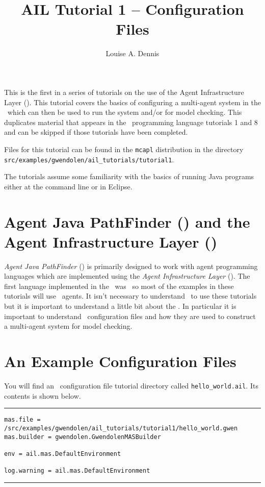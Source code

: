 \documentclass[a4]{article}
\author{Louise A. Dennis}
\title{AIL Tutorial 1 -- Configuration Files}
\begin{document}
\maketitle
This is the first in a series of tutorials on the use of the Agent Infrastructure Layer (\ail).  This tutorial covers the basics of configuring a multi-agent system in the \ail\ which can then be used to run the system and/or for model checking.  This duplicates material that appears in the \gwendolen\ programming language tutorials 1 and 8 and can be skipped if those tutorials have been completed.

Files for this tutorial can be found in the \texttt{mcapl} distribution in the directory \texttt{src/examples/gwendolen/ail\_tutorials/tutorial1}.

The tutorials assume some familiarity with the basics of running Java programs either at the command line or in Eclipse.

\section{Agent Java PathFinder (\ajpf) and the Agent Infrastructure Layer (\ail)}

\emph{Agent Java PathFinder} (\ajpf) is primarily designed to work with agent programming languages which are implemented using the \emph{Agent Infrastructure Layer} (\ail).  The first language implemented in the \ail\ was \gwendolen\ so most of the examples in these tutorials will use \gwendolen\ agents.  It isn't necessary to understand \gwendolen\ to use these tutorials but it is important to understand a little bit about the \ail.  In particular it is important to understand \ail\ configuration files and how they are used to construct a multi-agent system for model checking.

\section{An Example Configuration Files}

You will find an \ail\ configuration file tutorial directory called \texttt{hello\_world.ail}.  Its contents is shown below.

\newpage\noindent\rule{\textwidth}{1pt}
\begin{verbatim}
mas.file = /src/examples/gwendolen/ail_tutorials/tutorial1/hello_world.gwen
mas.builder = gwendolen.GwendolenMASBuilder

env = ail.mas.DefaultEnvironment

log.warning = ail.mas.DefaultEnvironment
\end{verbatim}
\rule{\textwidth}{1pt}
\end{document}
